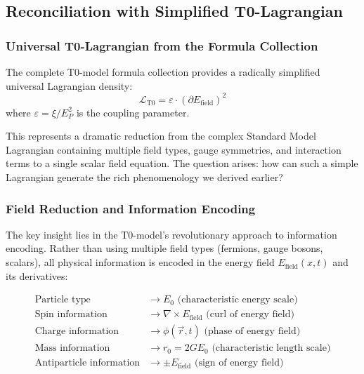 \documentclass[12pt,a4paper]{article}
\begin{document}
	\subsection{Reconciliation with Simplified T0-Lagrangian}
	
	\subsubsection{Universal T0-Lagrangian from the Formula Collection}
	
	The complete T0-model formula collection provides a radically simplified universal Lagrangian density:
	\begin{equation}
		\boxed{\mathcal{L}_{\text{T0}} = \varepsilon \cdot (\partial E_{\text{field}})^2}
	\end{equation}
	where $\varepsilon = \xi/E_P^2$ is the coupling parameter.
	
	This represents a dramatic reduction from the complex Standard Model Lagrangian containing multiple field types, gauge symmetries, and interaction terms to a single scalar field equation. The question arises: how can such a simple Lagrangian generate the rich phenomenology we derived earlier?
	
	\subsubsection{Field Reduction and Information Encoding}
	
	The key insight lies in the T0-model's revolutionary approach to information encoding. Rather than using multiple field types (fermions, gauge bosons, scalars), all physical information is encoded in the energy field $E_{\text{field}}(x,t)$ and its derivatives:
	
	\begin{align}
		\text{Particle type} &\rightarrow E_0 \text{ (characteristic energy scale)} \\
		\text{Spin information} &\rightarrow \nabla \times E_{\text{field}} \text{ (curl of energy field)} \\
		\text{Charge information} &\rightarrow \phi(\vec{r}, t) \text{ (phase of energy field)} \\
		\text{Mass information} &\rightarrow r_0 = 2GE_0 \text{ (characteristic length scale)} \\
		\text{Antiparticle information} &\rightarrow \pm E_{\text{field}} \text{ (sign of energy field)}
	\end{align}
	
\end{document}
